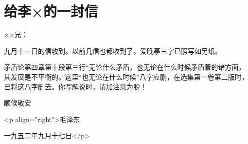 \section[给李×的一封信（一九五二年九月十七日）]{给李×的一封信}


××兄：

九月十一日的信收到。以前几信也都收到了。爱晚亭三字已照写如另纸。

矛盾论第四章第十段第三行“无论什么矛盾，也无论在什么时候矛盾着的诸方面，其发展是不平衡的。”这里“也无论在什么时候”八字应删，在选集第一卷第二版时，已将这八字删去。你写解说时，请加注意为朌！

顺候敬安

<p align="right">毛泽东

一九五二年九月十七日</p>


